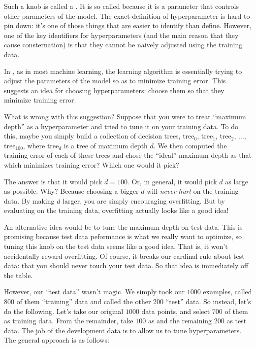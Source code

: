 
Such a knob is called a .  It is so called
because it is a parameter that controls other parameters of the model.
The exact definition of hyperparameter is hard to pin down: it's one
of those things that are easier to identify than define.  However, one
of the key identifiers for hyperparameters (and the main reason that
they cause consternation) is that they cannot be naively adjusted
using the training data.

In , as in most machine learning, the learning algorithm
is essentially trying to adjust the parameters of the model so as to
minimize training error.  This suggests an idea for choosing
hyperparameters: choose them so that they minimize training error.

What is wrong with this suggestion?  Suppose that you were to treat
``maximum depth'' as a hyperparameter and tried to tune it on your
training data.  To do this, maybe you simply build a collection of
decision trees, tree$_0$, tree$_1$, tree$_2$, $\dots$, tree$_{100}$,
where tree$_d$ is a tree of maximum depth $d$.  We then computed the
training error of each of these trees and chose the ``ideal'' maximum
depth as that which minimizes training error?  Which one would it
pick?

The answer is that it would pick $d=100$.  Or, in general, it would
pick $d$ as large as possible.  Why?  Because choosing a bigger $d$
will \emph{never hurt} on the training data.  By making $d$ larger,
you are simply encouraging overfitting.  But by evaluating on the
training data, overfitting actually looks like a good idea!

An alternative idea would be to tune the maximum depth on test data.
This is promising because test data peformance is what we really want
to optimize, so tuning this knob on the test data seems like a good
idea.  That is, it won't accidentally reward overfitting.  Of course,
it breaks our cardinal rule about test data: that you should never
touch your test data.  So that idea is immediately off the table.

However, our ``test data'' wasn't magic.  We simply took our $1000$
examples, called $800$ of them ``training'' data and called the other
$200$ ``test'' data.  So instead, let's do the following.  Let's take
our original $1000$ data points, and select $700$ of them as training
data.  From the remainder, take $100$ as  and the remaining $200$ as test
data.  The job of the development data is to allow us to tune
hyperparameters.  The general approach is as follows:

